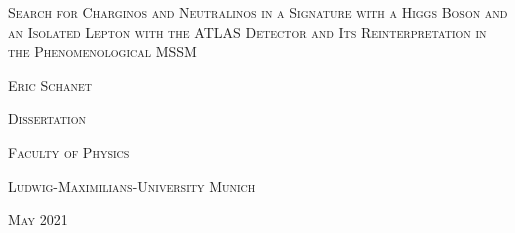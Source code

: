\documentclass[12pt, oneside]{book}
\begin{document}
 
\thispagestyle{empty}
\begin{center}
\begin{minipage}{1\textwidth}
\centering
    {\fontsize{19}{24}\selectfont\textsc{Search for Charginos and Neutralinos in a Signature with a Higgs Boson and an Isolated Lepton with the ATLAS Detector and Its Reinterpretation in the Phenomenological MSSM}\par}
    \vspace{3.5cm}
    {\fontsize{17}{21}\selectfont \textsc{Eric Schanet}\par}
    \vspace{5.5cm}
    {\fontsize{17}{21}\selectfont \textsc{Dissertation}\par}
    \vspace{1.2cm}
    {\fontsize{17}{23}\selectfont\textsc{Faculty of Physics}\par}
    {\fontsize{17}{23}\selectfont\textsc{Ludwig-Maximilians-University Munich}\par}
    \vspace{4.3cm}
    {\centering\Large \textsc{May} 2021\par}
\end{minipage}
\end{center}
\clearpage
 
\end{document}
